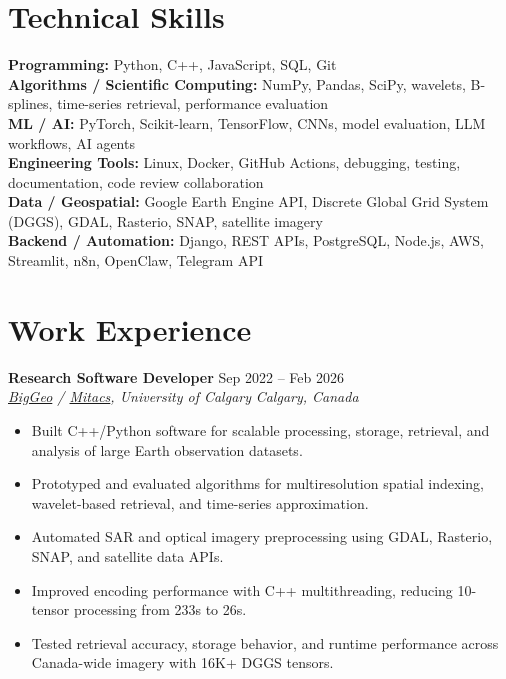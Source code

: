 \documentclass[a4paper,10pt]{article}
\newcommand{\resumeSubheading}[4]{
    \textbf{#1} \hfill #2 \\
    \textit{#3} \hfill \textit{#4}
}
\begin{document}
\section*{Technical Skills}

\textbf{Programming:} Python, C++, JavaScript, SQL, Git \\
\textbf{Algorithms / Scientific Computing:} NumPy, Pandas, SciPy, wavelets, B-splines, time-series retrieval, performance evaluation \\
\textbf{ML / AI:} PyTorch, Scikit-learn, TensorFlow, CNNs, model evaluation, LLM workflows, AI agents \\
\textbf{Engineering Tools:} Linux, Docker, GitHub Actions, debugging, testing, documentation, code review collaboration \\
\textbf{Data / Geospatial:} Google Earth Engine API, Discrete Global Grid System (DGGS), GDAL, Rasterio, SNAP, satellite imagery \\
\textbf{Backend / Automation:} Django, REST APIs, PostgreSQL, Node.js, AWS, Streamlit, n8n, OpenClaw, Telegram API


\section*{Work Experience}

\resumeSubheading
{Research Software Developer}
{Sep 2022 -- Feb 2026}
{\href{https://biggeo.com}{BigGeo} / \href{https://www.mitacs.ca/}{Mitacs}, University of Calgary}
{Calgary, Canada}
\begin{itemize}[leftmargin=0.25in]
    \item Built C++/Python software for scalable processing, storage, retrieval, and analysis of large Earth observation datasets.
    \item Prototyped and evaluated algorithms for multiresolution spatial indexing, wavelet-based retrieval, and time-series approximation.
    \item Automated SAR and optical imagery preprocessing using GDAL, Rasterio, SNAP, and satellite data APIs.
    \item Improved encoding performance with C++ multithreading, reducing 10-tensor processing from 233s to 26s.
    \item Tested retrieval accuracy, storage behavior, and runtime performance across Canada-wide imagery with 16K+ DGGS tensors.
\end{itemize}
\end{document}

